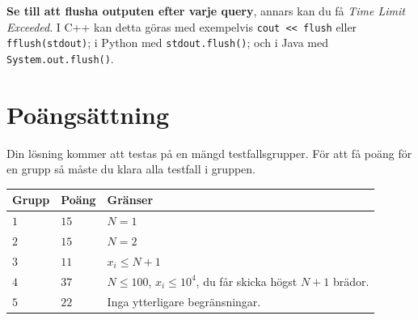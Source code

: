 \textbf{Se till att flusha outputen efter varje query}, annars kan du få \textit{Time Limit Exceeded}.
I C++ kan detta göras med exempelvis \texttt{cout << flush}
eller \texttt{fflush(stdout)};
i Python med \texttt{stdout.flush()};
och i Java med \texttt{System.out.flush()}.

\section*{Poängsättning}
Din lösning kommer att testas på en mängd testfallsgrupper.
För att få poäng för en grupp så måste du klara alla testfall i gruppen.


\noindent
\begin{tabular}{| l | l | p{12cm} |}
  \hline
  \textbf{Grupp} & \textbf{Poäng} & \textbf{Gränser} \\ \hline
  $1$   & $15$       & $N = 1$\\ \hline
  $2$   & $15$       & $N = 2$  \\ \hline
  $3$   & $11$       & $x_i \leq N+1$ \\ \hline
  $4$   & $37$       & $N \leq 100$, $x_i \leq 10^4$, du får skicka högst $N+1$ brädor. \\ \hline
  $5$   & $22$       & Inga ytterligare begränsningar. \\ \hline
\end{tabular}
